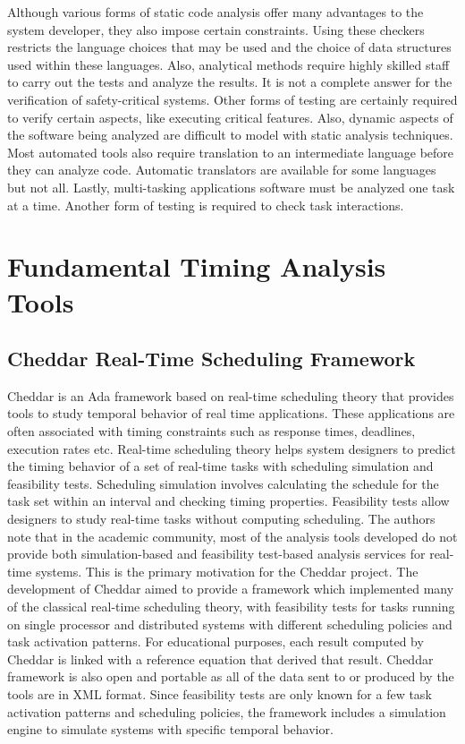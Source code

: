 Although various forms of static code analysis offer many advantages to the system developer, they also impose certain constraints. Using these checkers restricts the language choices that may be used and the choice of data structures used within these languages. Also, analytical methods require highly skilled staff to carry out the tests and analyze the results. It is not a complete answer for the verification of safety-critical systems. Other forms of testing are certainly required to verify certain aspects, like executing critical features. Also, dynamic aspects of the software being analyzed are difficult to model with static analysis techniques. Most automated tools also require translation to an intermediate language before they can analyze code. Automatic translators are available for some languages but not all. Lastly, multi-tasking applications software must be analyzed one task at a time. Another form of testing is required to check task interactions. 

\section{Fundamental Timing Analysis Tools}

\subsection{Cheddar Real-Time Scheduling Framework}

Cheddar \cite{Cheddar} is an Ada framework based on real-time scheduling theory that provides tools to study temporal behavior of real time applications. These applications are often associated with timing constraints such as response times, deadlines, execution rates etc. Real-time scheduling theory helps system designers to predict the timing behavior of a set of real-time tasks with scheduling simulation and feasibility tests. Scheduling simulation involves calculating the schedule for the task set within an interval and checking timing properties. Feasibility tests allow designers to study real-time tasks without computing scheduling. The authors note that in the academic community, most of the analysis tools developed do not provide both simulation-based and feasibility test-based analysis services for real-time systems. This is the primary motivation for the Cheddar project. The development of Cheddar aimed to provide a framework which implemented many of the classical real-time scheduling theory, with feasibility tests for tasks running on single processor and distributed systems with different scheduling policies and task activation patterns. For educational purposes, each result computed by Cheddar is linked with a reference equation that derived that result. Cheddar framework is also open and portable as all of the data sent to or produced by the tools are in XML format. Since feasibility tests are only known for a few task activation patterns and scheduling policies, the framework includes a simulation engine to simulate systems with specific temporal behavior. 

